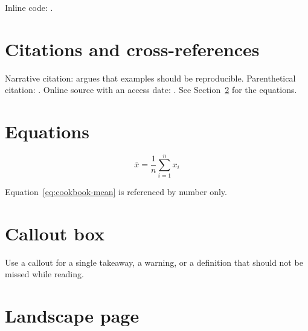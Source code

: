 \documentclass[10pt, a4paper]{article}
\begin{document}
Inline code: .

\section{Citations and cross-references}

Narrative citation: \textcite{sample-article} argues that examples should be
reproducible. Parenthetical citation: \parencite{sample-book}. Online source
with an access date: \parencite{sample-online}. See
Section~\ref{sec:cookbook-equations} for the equations.

\section{Equations}
\label{sec:cookbook-equations}

\begin{equation}
    \bar{x} = \frac{1}{n}\sum_{i=1}^{n} x_i
    \label{eq:cookbook-mean}
\end{equation}

Equation~\eqref{eq:cookbook-mean} is referenced by number only.

\section{Callout box}

\begin{tcolorbox}[colback=BrandLight, colframe=BrandPrimary,
                  boxrule=0.6pt, arc=3pt, title=Note]
    Use a callout for a single takeaway, a warning, or a definition that should
    not be missed while reading.
\end{tcolorbox}

\section{Landscape page}
\end{document}
